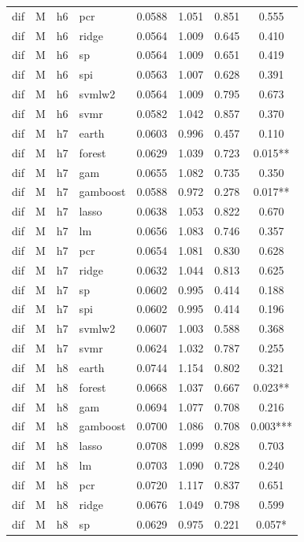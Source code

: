 \begin{ThreePartTable}
\begin{longtable}[t]{llclcccc}
dif & M & h6 & pcr & 0.0588 & 1.051 & 0.851 & 0.555\\
dif & M & h6 & ridge & 0.0564 & 1.009 & 0.645 & 0.410\\
dif & M & h6 & sp & 0.0564 & 1.009 & 0.651 & 0.419\\
dif & M & h6 & spi & 0.0563 & 1.007 & 0.628 & 0.391\\
dif & M & h6 & svmlw2 & 0.0564 & 1.009 & 0.795 & 0.673\\
dif & M & h6 & svmr & 0.0582 & 1.042 & 0.857 & 0.370\\
\addlinespace
dif & M & h7 & earth & 0.0603 & 0.996 & 0.457 & 0.110\\
dif & M & h7 & forest & 0.0629 & 1.039 & 0.723 & 0.015**\\
dif & M & h7 & gam & 0.0655 & 1.082 & 0.735 & 0.350\\
dif & M & h7 & gamboost & 0.0588 & 0.972 & 0.278 & 0.017**\\
dif & M & h7 & lasso & 0.0638 & 1.053 & 0.822 & 0.670\\
dif & M & h7 & lm & 0.0656 & 1.083 & 0.746 & 0.357\\
dif & M & h7 & pcr & 0.0654 & 1.081 & 0.830 & 0.628\\
dif & M & h7 & ridge & 0.0632 & 1.044 & 0.813 & 0.625\\
dif & M & h7 & sp & 0.0602 & 0.995 & 0.414 & 0.188\\
dif & M & h7 & spi & 0.0602 & 0.995 & 0.414 & 0.196\\
dif & M & h7 & svmlw2 & 0.0607 & 1.003 & 0.588 & 0.368\\
dif & M & h7 & svmr & 0.0624 & 1.032 & 0.787 & 0.255\\
\addlinespace
dif & M & h8 & earth & 0.0744 & 1.154 & 0.802 & 0.321\\
dif & M & h8 & forest & 0.0668 & 1.037 & 0.667 & 0.023**\\
dif & M & h8 & gam & 0.0694 & 1.077 & 0.708 & 0.216\\
dif & M & h8 & gamboost & 0.0700 & 1.086 & 0.708 & 0.003***\\
dif & M & h8 & lasso & 0.0708 & 1.099 & 0.828 & 0.703\\
dif & M & h8 & lm & 0.0703 & 1.090 & 0.728 & 0.240\\
dif & M & h8 & pcr & 0.0720 & 1.117 & 0.837 & 0.651\\
dif & M & h8 & ridge & 0.0676 & 1.049 & 0.798 & 0.599\\
dif & M & h8 & sp & 0.0629 & 0.975 & 0.221 & 0.057*\\

\end{longtable}
\end{ThreePartTable}

